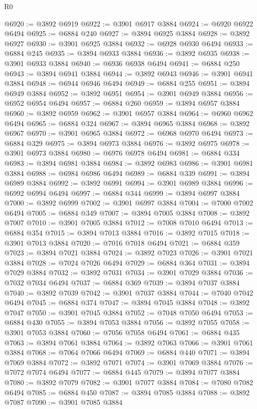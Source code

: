 \begin{lexlean}{R0}
\begin{coremodule}
@6920 := @3892 @6919
@6922 := @3901 @6917 @3884
@6924 := @6920 @6922 @6494
@6925 := @6884 @240
@6927 := @3894 @6925 @3884
@6928 := @3892 @6927
@6930 := @3901 @6925 @3884
@6932 := @6928 @6930 @6494
@6933 := @6884 @245
@6935 := @3894 @6933 @3884
@6936 := @3892 @6935
@6938 := @3901 @6933 @3884
@6940 := @6936 @6938 @6494
@6941 := @6884 @250
@6943 := @3894 @6941 @3884
@6944 := @3892 @6943
@6946 := @3901 @6941 @3884
@6948 := @6944 @6946 @6494
@6949 := @6884 @255
@6951 := @3894 @6949 @3884
@6952 := @3892 @6951
@6954 := @3901 @6949 @3884
@6956 := @6952 @6954 @6494
@6957 := @6884 @260
@6959 := @3894 @6957 @3884
@6960 := @3892 @6959
@6962 := @3901 @6957 @3884
@6964 := @6960 @6962 @6494
@6965 := @6884 @324
@6967 := @3894 @6965 @3884
@6968 := @3892 @6967
@6970 := @3901 @6965 @3884
@6972 := @6968 @6970 @6494
@6973 := @6884 @329
@6975 := @3894 @6973 @3884
@6976 := @3892 @6975
@6978 := @3901 @6973 @3884
@6980 := @6976 @6978 @6494
@6981 := @6884 @334
@6983 := @3894 @6981 @3884
@6984 := @3892 @6983
@6986 := @3901 @6981 @3884
@6988 := @6984 @6986 @6494
@6989 := @6884 @339
@6991 := @3894 @6989 @3884
@6992 := @3892 @6991
@6994 := @3901 @6989 @3884
@6996 := @6992 @6994 @6494
@6997 := @6884 @344
@6999 := @3894 @6997 @3884
@7000 := @3892 @6999
@7002 := @3901 @6997 @3884
@7004 := @7000 @7002 @6494
@7005 := @6884 @349
@7007 := @3894 @7005 @3884
@7008 := @3892 @7007
@7010 := @3901 @7005 @3884
@7012 := @7008 @7010 @6494
@7013 := @6884 @354
@7015 := @3894 @7013 @3884
@7016 := @3892 @7015
@7018 := @3901 @7013 @3884
@7020 := @7016 @7018 @6494
@7021 := @6884 @359
@7023 := @3894 @7021 @3884
@7024 := @3892 @7023
@7026 := @3901 @7021 @3884
@7028 := @7024 @7026 @6494
@7029 := @6884 @364
@7031 := @3894 @7029 @3884
@7032 := @3892 @7031
@7034 := @3901 @7029 @3884
@7036 := @7032 @7034 @6494
@7037 := @6884 @369
@7039 := @3894 @7037 @3884
@7040 := @3892 @7039
@7042 := @3901 @7037 @3884
@7044 := @7040 @7042 @6494
@7045 := @6884 @374
@7047 := @3894 @7045 @3884
@7048 := @3892 @7047
@7050 := @3901 @7045 @3884
@7052 := @7048 @7050 @6494
@7053 := @6884 @430
@7055 := @3894 @7053 @3884
@7056 := @3892 @7055
@7058 := @3901 @7053 @3884
@7060 := @7056 @7058 @6494
@7061 := @6884 @435
@7063 := @3894 @7061 @3884
@7064 := @3892 @7063
@7066 := @3901 @7061 @3884
@7068 := @7064 @7066 @6494
@7069 := @6884 @440
@7071 := @3894 @7069 @3884
@7072 := @3892 @7071
@7074 := @3901 @7069 @3884
@7076 := @7072 @7074 @6494
@7077 := @6884 @445
@7079 := @3894 @7077 @3884
@7080 := @3892 @7079
@7082 := @3901 @7077 @3884
@7084 := @7080 @7082 @6494
@7085 := @6884 @450
@7087 := @3894 @7085 @3884
@7088 := @3892 @7087
@7090 := @3901 @7085 @3884

\end{coremodule}
\end{lexlean}
